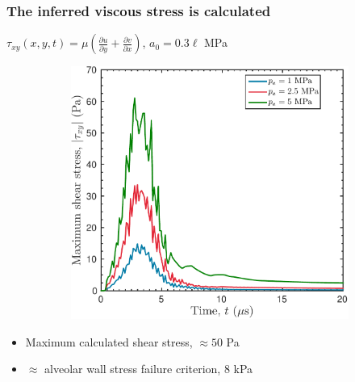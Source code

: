 % 
% 
\begin{frame}\frametitle{\vspace*{0.5cm}The inferred viscous stress is calculated}
  \begin{center}
    $\tau_{xy}(x,y,t) = \mu\left(\frac{\partial u}{\partial y}+ \frac{\partial v}{\partial x}\right)$,
    \qquad$a_0 = 0.3\ell$ MPa
  \end{center}
  \begin{figure}
    \captionsetup[subfigure]{labelformat=empty}
    \begin{subfigure}{0.5\textwidth}
      \includegraphics[width=\textwidth]{../figs/lung_figs/rmawave_1_A10,25,50_a30_tauxy_dim_15-Jun-2017}
    \end{subfigure}
  \end{figure}
  \vspace*{-0.25cm}
  \begin{itemize}
  \item Maximum calculated shear stress, $\approx 50$ Pa 
  \item $\approx$ alveolar wall stress failure criterion, $8$ kPa \citep{West1991}
  \end{itemize}
\end{frame}
% 
% 
